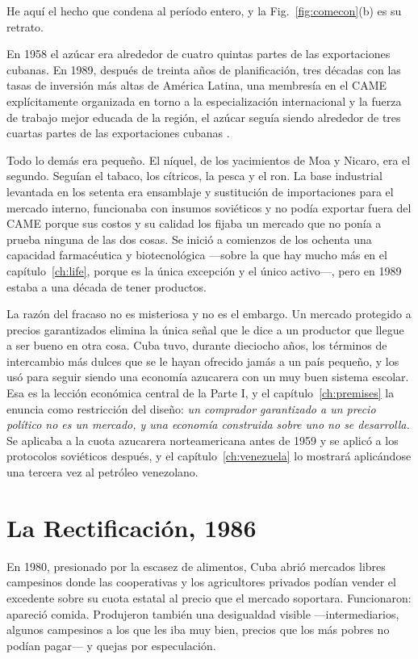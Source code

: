 He aquí el hecho que condena al período entero, y la Fig.~\ref{fig:comecon}(b) es
su retrato.

En 1958 el azúcar era alrededor de cuatro quintas partes de las exportaciones
cubanas. En 1989, después de treinta años de planificación, tres décadas con las
tasas de inversión más altas de América Latina, una membresía en el CAME
explícitamente organizada en torno a la especialización internacional y la fuerza
de trabajo mejor educada de la región, el azúcar seguía siendo alrededor de tres
cuartas partes de las exportaciones cubanas \citep{onei,mesalago2000}.\unv{}

Todo lo demás era pequeño. El níquel, de los yacimientos de Moa y Nicaro, era el
segundo. Seguían el tabaco, los cítricos, la pesca y el ron. La base industrial
levantada en los setenta era ensamblaje y sustitución de importaciones para el
mercado interno, funcionaba con insumos soviéticos y no podía exportar fuera del
CAME porque sus costos y su calidad los fijaba un mercado que no ponía a prueba
ninguna de las dos cosas. Se inició a comienzos de los ochenta una capacidad
farmacéutica y biotecnológica ---sobre la que hay mucho más en el
capítulo~\ref{ch:life}, porque es la única excepción y el único activo---, pero
en 1989 estaba a una década de tener productos.

La razón del fracaso no es misteriosa y no es el embargo. Un mercado protegido a
precios garantizados elimina la única señal que le dice a un productor que llegue
a ser bueno en otra cosa. Cuba tuvo, durante dieciocho años, los términos de
intercambio más dulces que se le hayan ofrecido jamás a un país pequeño, y los
usó para seguir siendo una economía azucarera con un muy buen sistema escolar.
Esa es la lección económica central de la Parte I, y el
capítulo~\ref{ch:premises} la enuncia como restricción del diseño: \emph{un
comprador garantizado a un precio político no es un mercado, y una economía
construida sobre uno no se desarrolla.} Se aplicaba a la cuota azucarera
norteamericana antes de 1959 y se aplicó a los protocolos soviéticos después, y el
capítulo~\ref{ch:venezuela} lo mostrará aplicándose una tercera vez al petróleo
venezolano.

\section{La Rectificación, 1986}

En 1980, presionado por la escasez de alimentos, Cuba abrió mercados libres
campesinos donde las cooperativas y los agricultores privados podían vender el
excedente sobre su cuota estatal al precio que el mercado soportara. Funcionaron:
apareció comida. Produjeron también una desigualdad visible ---intermediarios,
algunos campesinos a los que les iba muy bien, precios que los más pobres no
podían pagar--- y quejas por especulación.

